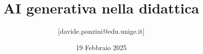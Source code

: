 

\title{AI generativa nella didattica}

\author[Davide Ponzini]{
    [davide.ponzini@edu.unige.it]
}


\date[2025]{19 Febbraio 2025}

